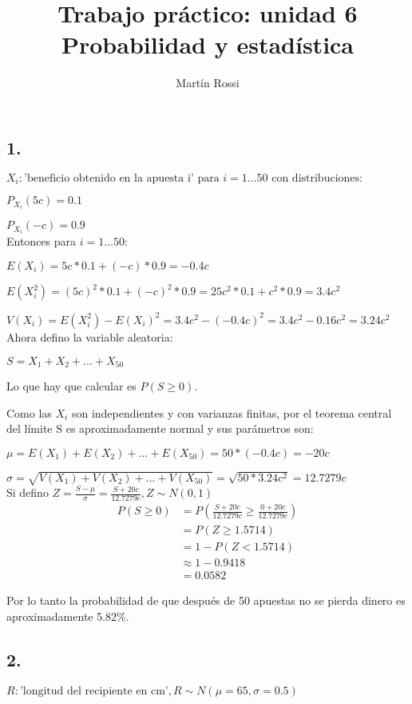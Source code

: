 \documentclass[12pt,fleqn]{article}
\title{\LARGE \textbf{Trabajo práctico: unidad 6}\\\large Probabilidad y estadística}
\author{Martín Rossi}
\date{}
\begin{document}
\maketitle
\subsection*{1.}
$X_i: \textrm{'beneficio obtenido en la apuesta i' para } i=1...50 \textrm{ con distribuciones:}$

$P_{X_i}(5c)=0.1$

$P_{X_i}(-c)=0.9$\\

Entonces para $i=1...50$:

$E(X_i)=5c*0.1+(-c)*0.9=-0.4c$

$E(X_i^2)=(5c)^2*0.1+(-c)^2*0.9=25c^2*0.1+c^2*0.9=3.4c^2$

$V(X_i)=E(X_i^2)-E(X_i)^2=3.4c^2-(-0.4c)^2=3.4c^2-0.16c^2=3.24c^2$\\

Ahora defino la variable aleatoria:

$S=X_1+X_2+...+X_{50}$

Lo que hay que calcular es $P(S \ge 0)$.

Como las $X_i$ son independientes y con varianzas finitas, por el teorema central del límite S es aproximadamente normal y sus parámetros son:

$\mu=E(X_1)+E(X_2)+...+E(X_{50})=50*(-0.4c)=-20c$

$\sigma=\sqrt{V(X_1)+V(X_2)+...+V(X_{50})}=\sqrt{50*3.24c^2}=12.7279c$\\

Si defino $Z=\frac{S-\mu}{\sigma}=\frac{S+20c}{12.7279c}, Z \sim N(0,1)$
\begin{align*}
  P(S \ge 0)&=P(\frac{S+20c}{12.7279c}\ge\frac{0+20c}{12.7279c})\\
            &=P(Z\ge 1.5714)\\
            &=1-P(Z<1.5714)\\
            &\approx 1-0.9418\\
            &=0.0582
\end{align*}

Por lo tanto la probabilidad de que después de 50 apuestas no se pierda dinero es aproximadamente 5.82\%.
\newpage
\subsection*{2.}
$R: \textrm{'longitud del recipiente en cm'}, R \sim N(\mu=65,\sigma=0.5)$
\end{document}
